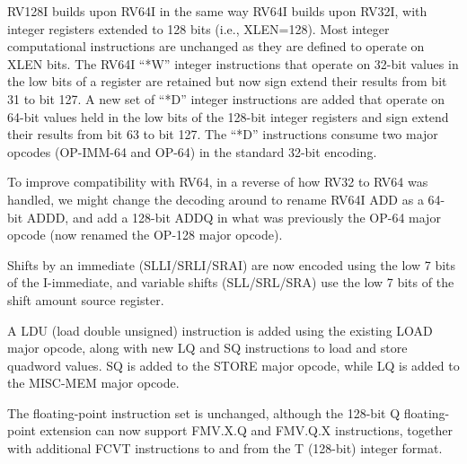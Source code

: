 RV128I builds upon RV64I in the same way RV64I builds upon RV32I, with
integer registers extended to 128 bits (i.e., XLEN=128).  Most integer
computational instructions are unchanged as they are defined to
operate on XLEN bits.  The RV64I ``*W'' integer instructions that
operate on 32-bit values in the low bits of a register are retained
but now sign extend their results from bit 31 to bit 127. A new set of
``*D'' integer instructions are added that operate on 64-bit values
held in the low bits of the 128-bit integer registers and sign extend
their results from bit 63 to bit 127.  The ``*D'' instructions consume
two major opcodes (OP-IMM-64 and OP-64) in the standard 32-bit
encoding.

\begin{commentary}
  To improve compatibility with RV64, in a reverse of how RV32 to RV64
  was handled, we might change the decoding around to rename RV64I ADD
  as a 64-bit ADDD, and add a 128-bit ADDQ in what was previously the
  OP-64 major opcode (now renamed the OP-128 major opcode).
\end{commentary}

Shifts by an immediate (SLLI/SRLI/SRAI) are now encoded using the low
7 bits of the I-immediate, and variable shifts (SLL/SRL/SRA) use the
low 7 bits of the shift amount source register.

A LDU (load double unsigned) instruction is added using the existing
LOAD major opcode, along with new LQ and SQ instructions to load and
store quadword values.  SQ is added to the STORE major opcode, while
LQ is added to the MISC-MEM major opcode.

The floating-point instruction set is unchanged, although the 128-bit
Q floating-point extension can now support FMV.X.Q and FMV.Q.X
instructions, together with additional FCVT instructions to and from
the T (128-bit) integer format.



